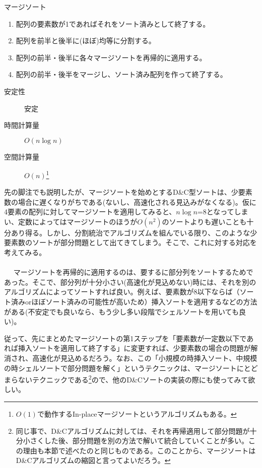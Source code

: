\begin{itembox}[l]{マージソート}
\begin{enumerate}
\item 配列の要素数が1であればそれをソート済みとして終了する。
\item 配列を前半と後半に(ほぼ)均等に分割する。
\item 配列の前半・後半に各々マージソートを再帰的に適用する。
\item 配列の前半・後半をマージし、ソート済み配列を作って終了する。
\end{enumerate}
\begin{multicols}{3}
\begin{description}
\item[安定性] 安定
\item[時間計算量] $O(n \log n)$
\item[空間計算量] $O(n)$\footnote{$O(1)$で動作するIn-placeマージソートというアルゴリズムもある。}
\end{description}
\end{multicols}
\end{itembox}

先の脚注でも説明したが、マージソートを始めとするD\&C型ソートは、少要素数の場合に遅くなりがちである(ないし、高速化される見込みがなくなる)。仮に4要素の配列に対してマージソートを適用してみると、$n\log n$=8となってしまい、定数によってはマージソートのほうが$O(n^2)$のソートよりも遅いことも十分あり得る。しかし、分割統治でアルゴリズムを組んでいる限り、このような少要素数のソートが部分問題として出てきてしまう。そこで、これに対する対応を考えてみる。
\\ \\　
マージソートを再帰的に適用するのは、要するに部分列をソートするためであった。そこで、部分列が十分小さい(高速化が見込めない)時には、それを別のアルゴリズムによってソートすれば良い。例えば、要素数が8以下ならば（ソート済みorほぼソート済みの可能性が高いため）挿入ソートを適用するなどの方法がある(不安定でも良いなら、もう少し多い段階でシェルソートを用いても良い)。

従って、先にまとめたマージソートの第1ステップを「要素数が一定数以下であれば挿入ソートを適用して終了する」に変更すれば、少要素数の場合の問題が解消され、高速化が見込めるだろう。なお、この「小規模の時挿入ソート、中規模の時シェルソートで部分問題を解く」というテクニックは、マージソートにとどまらないテクニックである\footnote{同じ事で、D\&Cアルゴリズムに対しては、それを再帰適用して部分問題が十分小さくした後、部分問題を別の方法で解いて統合していくことが多い。この理由も本節で述べたのと同じものである。このことから、マージソートはD\&Cアルゴリズムの縮図と言ってよいだろう。}ので、他のD\&Cソートの実装の際にも使ってみて欲しい。

